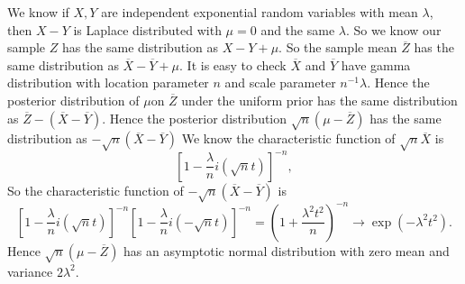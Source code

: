 \documentclass[oneside,english]{amsbook}
\numberwithin{section}{chapter}
\numberwithin{equation}{section}
\numberwithin{figure}{section}
\theoremstyle{plain}
\theoremstyle{plain}
\theoremstyle{definition}
\theoremstyle{plain}
\theoremstyle{plain}
\theoremstyle{remark}
\theoremstyle{definition}
\theoremstyle{definition}
\begin{document}
We know if $X,Y$ are independent exponential random variables with
mean $\lambda$, then $X-Y$ is Laplace distributed with $\mu=0$
and the same $\lambda$. So we know our sample $Z$ has the same distribution
as $X-Y+\mu$. So the sample mean $\overline{Z}$ has the same distribution
as $\overline{X}-\overline{Y}+\mu$. It is easy to check $\overline{X}$
and $\overline{Y}$ have gamma distribution with location parameter
$n$ and scale parameter $n^{-1}\lambda$. Hence the posterior distribution
of $\mu$on $\overline{Z}$ under the uniform prior has the same distribution
as $\overline{Z}-\left(\overline{X}-\overline{Y}\right)$. Hence the
posterior distribution $\sqrt{n}\left(\mu-\overline{Z}\right)$ has
the same distribution as $-\sqrt{n}\left(\overline{X}-\overline{Y}\right)$
We know the characteristic function of $\sqrt{n}$$\overline{X}$
is 
\[
\left[1-\frac{\lambda}{n}i\left(\sqrt{n}t\right)\right]^{-n},
\]
So the characteristic function of $-\sqrt{n}\left(\overline{X}-\overline{Y}\right)$
is 
\[
\left[1-\frac{\lambda}{n}i\left(\sqrt{n}t\right)\right]^{-n}\left[1-\frac{\lambda}{n}i\left(-\sqrt{n}t\right)\right]^{-n}=\left(1+\frac{\lambda^{2}t^{2}}{n}\right)^{-n}\rightarrow\exp\left(-\lambda^{2}t^{2}\right).
\]
Hence $\sqrt{n}\left(\mu-\overline{Z}\right)$ has an asymptotic normal
distribution with zero mean and variance $2\lambda^{2}$.
\end{document}
